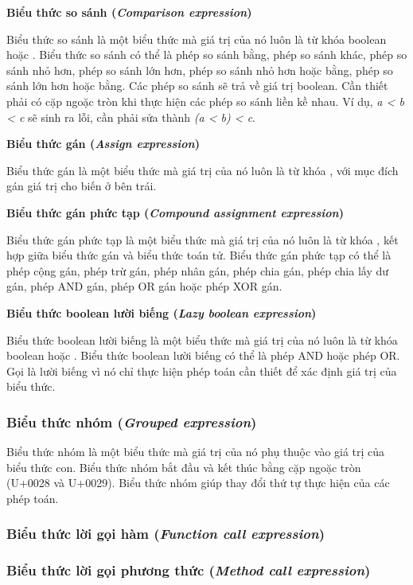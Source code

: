 \noindent\textbf{Biểu thức so sánh (\textit{Comparison expression})}

\regexcompexpr

Biểu thức so sánh là một biểu thức mà giá trị của nó luôn là từ khóa boolean  hoặc . Biểu thức so sánh có thể là phép so sánh bằng, phép so sánh khác, phép so sánh nhỏ hơn, phép so sánh lớn hơn, phép so sánh nhỏ hơn hoặc bằng, phép so sánh lớn hơn hoặc bằng. Các phép so sánh sẽ trả về giá trị boolean. Cần thiết phải có cặp ngoặc tròn khi thực hiện các phép so sánh liền kề nhau. Ví dụ, \textit{a < b < c} sẽ sinh ra lỗi, cần phải sửa thành \textit{(a < b) < c}.

\noindent\textbf{Biểu thức gán (\textit{Assign expression})}

\regexassignexpr

Biểu thức gán là một biểu thức mà giá trị của nó luôn là từ khóa , với mục đích gán giá trị cho biến ở bên trái.

\noindent\textbf{Biểu thức gán phức tạp (\textit{Compound assignment expression})}

\regexcompoundassignexpr

Biểu thức gán phức tạp là một biểu thức mà giá trị của nó luôn là từ khóa , kết hợp giữa biểu thức gán và biểu thức toán tử. Biểu thức gán phức tạp có thể là phép cộng gán, phép trừ gán, phép nhân gán, phép chia gán, phép chia lấy dư gán, phép AND gán, phép OR gán hoặc phép XOR gán.

\noindent\textbf{Biểu thức boolean lười biếng (\textit{Lazy boolean expression})}

\regexlazyboolexpr

Biểu thức boolean lười biếng là một biểu thức mà giá trị của nó luôn là từ khóa boolean  hoặc . Biểu thức boolean lười biếng có thể là phép AND hoặc phép OR. Gọi là lười biếng vì nó chỉ thực hiện phép toán cần thiết để xác định giá trị của biểu thức.

\subsubsection{Biểu thức nhóm (\textit{Grouped expression})}

\regexgroupexpr

Biểu thức nhóm là một biểu thức mà giá trị của nó phụ thuộc vào giá trị của biểu thức con. Biểu thức nhóm bắt đầu và kết thúc bằng cặp ngoặc tròn (U+0028 và U+0029). Biểu thức nhóm giúp thay đổi thứ tự thực hiện của các phép toán.

\subsubsection{Biểu thức lời gọi hàm (\textit{Function call expression})}

\subsubsection{Biểu thức lời gọi phương thức (\textit{Method call expression})}
